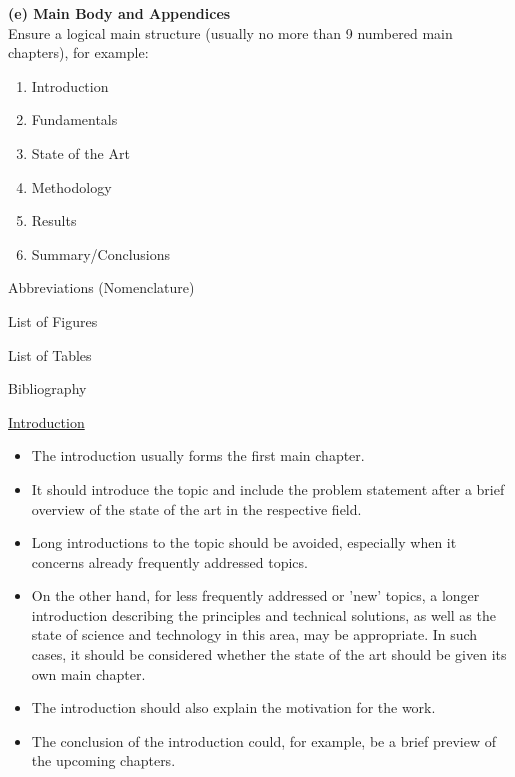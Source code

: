 \textbf{(e) Main Body and Appendices} \\
Ensure a logical main structure (usually no more than 9 numbered main chapters), for example:

\begin{enumerate}
    \item Introduction
    \item Fundamentals
    \item State of the Art
    \item Methodology
    \item Results
    \item Summary/Conclusions
\end{enumerate}
\hspace{5mm}
Abbreviations (Nomenclature)

\vspace{1mm}
\hspace{5mm}
List of Figures

\vspace{1mm}
\hspace{5mm}
List of Tables

\vspace{1mm}
\hspace{5mm}
Bibliography

\vspace{5mm}
\underline{Introduction}

\begin{itemize}
    \item The introduction usually forms the first main chapter.
    \item It should introduce the topic and include the problem statement after a brief overview of the state of the art in the respective field.
    \item Long introductions to the topic should be avoided, especially when it concerns already frequently addressed topics.
    \item On the other hand, for less frequently addressed or 'new' topics, a longer introduction describing the principles and technical solutions, as well as the state of science and technology in this area, may be appropriate. In such cases, it should be considered whether the state of the art should be given its own main chapter.
    \item The introduction should also explain the motivation for the work.
    \item The conclusion of the introduction could, for example, be a brief preview of the upcoming chapters.
\end{itemize}

